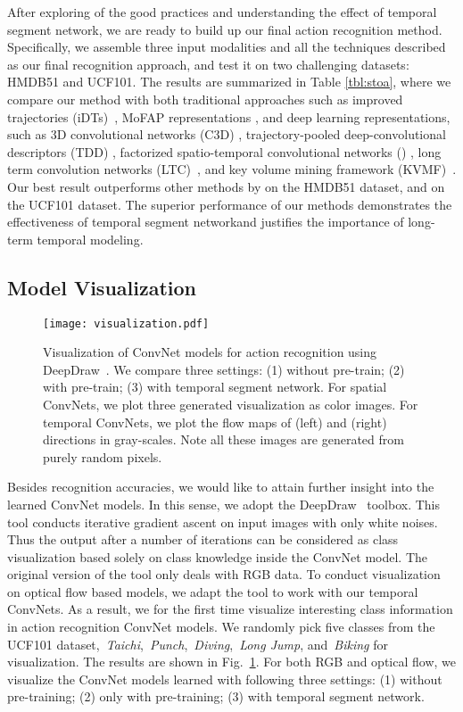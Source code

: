 \documentclass[runningheads]{llncs}
\newcommand{\SEGNET}{temporal segment network}
\begin{document}
After exploring of the good practices and understanding the effect of \SEGNET, we are ready to build up our final action recognition method. Specifically, we assemble three input modalities and all the techniques described as our final recognition approach, and test it on two challenging datasets: HMDB51 and UCF101. The results are summarized in Table \ref{tbl:stoa}, where we compare our method with both traditional approaches such as improved trajectories (iDTs)~\cite{WangS13a}, MoFAP representations \cite{WangQT15b}, and deep learning representations, such as 3D convolutional networks (C3D) \cite{TranBFTP15}, trajectory-pooled deep-convolutional descriptors (TDD) \cite{WangQT15a}, factorized spatio-temporal convolutional networks () \cite{SunJYS15}, long term convolution networks (LTC)~\cite{varol}, and key volume mining framework (KVMF)~\cite{ZhuW2016}. Our best result outperforms other methods by  on the HMDB51 dataset, and  on the UCF101 dataset. The superior performance of our methods demonstrates the effectiveness of \SEGNET and justifies the importance of long-term temporal modeling.

\subsection{Model Visualization}
\begin{figure}[t]
	\centering
	\texttt{[image: visualization.pdf]}
	\caption{Visualization of ConvNet models for action recognition using DeepDraw~\cite{DeepDraw}. 
		We compare three settings: (1) without pre-train; (2) with pre-train; (3) with \SEGNET .
		For spatial ConvNets, we plot three generated visualization as color images.
		For temporal ConvNets, we plot the flow maps of  (left) and  (right) directions in gray-scales.
		Note all these images are generated from purely random pixels.}
	\label{fig:visualization}
\end{figure}

Besides recognition accuracies, we would like to attain further insight into the learned ConvNet models. In this sense, we adopt the DeepDraw~\cite{DeepDraw} toolbox. This tool conducts iterative gradient ascent on input images with only white noises. Thus the output after a number of iterations can be considered as class visualization based solely on class knowledge inside the ConvNet model. The original version of the tool only deals with RGB data. To conduct visualization on optical flow based models, we adapt the tool to work with our temporal ConvNets. As a result, we for the first time visualize interesting class information in action recognition ConvNet models. We randomly pick five classes from the UCF101 dataset,~\emph{Taichi},~\emph{Punch},~\emph{Diving},~\emph{Long Jump}, and~\emph{Biking} for visualization. The results are shown in Fig.~\ref{fig:visualization}. For both RGB and optical flow, we visualize the ConvNet models learned with following three settings: (1) without pre-training; (2) only with pre-training; (3) with \SEGNET.
\end{document}
